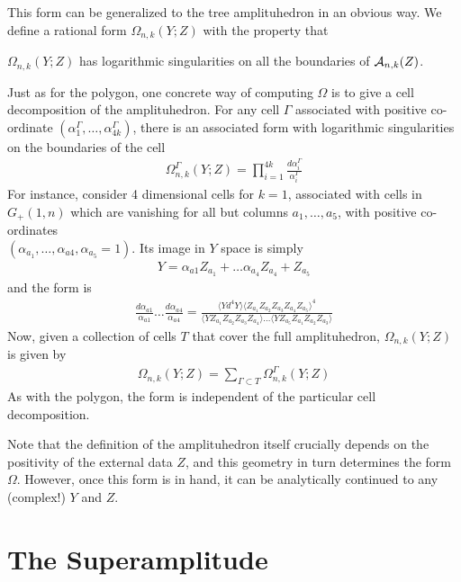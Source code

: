 \documentclass[12pt,nohyper,twosided]{JHEP3}
\newcommand{\be}{\begin{eqnarray}}
\newcommand{\ee}{\end{eqnarray}}
\begin{document}
This form can be generalized to the tree amplituhedron in an obvious
way. We define a rational form $\Omega_{n,k}(Y;Z)$ with the property
that

\begin{center}
$\Omega_{n,k}(Y;Z)$ has logarithmic singularities on all the
boundaries of ${\cal A}_{n,k}(Z)$.
\end{center}

Just as for the polygon, one concrete way of computing  $\Omega$ is
to give a cell decomposition of the amplituhedron. For any cell
$\Gamma$ associated with positive co-ordinate $(\alpha^\Gamma_1,
\dots, \alpha^\Gamma_{4k})$, there is an associated form with
logarithmic singularities on the boundaries of the cell \be
\Omega_{n,k}^\Gamma(Y; Z) = \prod_{i = 1}^{4k} \frac{d
\alpha_i^\Gamma}{\alpha_i^\Gamma} \ee For instance, consider 4
dimensional cells for $k=1$, associated with cells in $G_+(1,n)$
which are vanishing for all but columns $a_1, \dots, a_5$, with
positive co-ordinates\\  $(\alpha_{a_1}, \dots, \alpha_{a4},
\alpha_{a_5} =1)$.  Its image in $Y$ space is simply \be Y =
\alpha_{a1} Z_{a_1} + \dots \alpha_{a_4} Z_{a_4}  + Z_{a_5} \ee and
the form is \be \frac{d \alpha_{a1}}{\alpha_{a1}} \dots \frac{d
\alpha_{a4}}{\alpha_{a4}} = \frac{\langle Y d^4 Y \rangle \langle
Z_{a_1} Z_{a_2} Z_{a_3} Z_{a_4} Z_{a_5} \rangle^4}{\langle Y Z_{a_1}
Z_{a_2} Z_{a_3} Z_{a_4} \rangle \dots \langle Y Z_{a_5} Z_{a_1}
Z_{a_2} Z_{a_3} \rangle} \ee Now, given a collection of cells $T$
that cover the full amplituhedron, $\Omega_{n,k}(Y;Z)$ is given by
\be \Omega_{n,k}(Y;Z) = \sum_{\Gamma \subset T}
\Omega_{n,k}^\Gamma(Y;Z) \ee As with the polygon, the form is
independent of the particular cell decomposition.

Note that the definition of the amplituhedron itself crucially
depends on the positivity of the external data $Z$, and this
geometry in turn determines the form $\Omega$. However, once this
form is in hand, it can be analytically continued to any
(complex!) $Y$ and $Z$.

\section{The Superamplitude}
\end{document}
